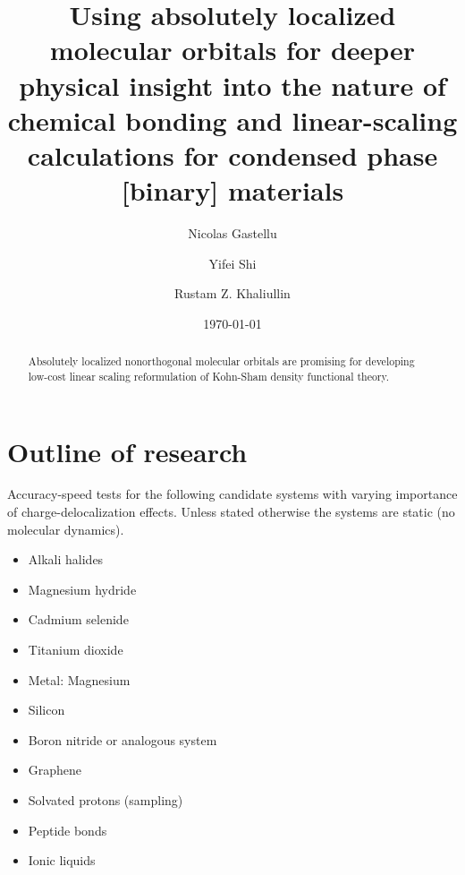 \documentclass[aps,prb,twocolumn,amsmath,amssymb,superscriptaddress,longbibliography]{revtex4-1}
\begin{document}
\title{
Using absolutely localized molecular orbitals for deeper physical insight into the nature of chemical bonding and linear-scaling calculations for condensed phase [binary] materials 
}

\author{Nicolas Gastellu}
\author{Yifei Shi}
\author{Rustam Z. Khaliullin}

\date{\today}

\begin{abstract}
Absolutely localized nonorthogonal molecular orbitals are promising for developing low-cost linear scaling reformulation of Kohn-Sham density functional theory.
\end{abstract}

\maketitle
 
\section{Outline of research}

Accuracy-speed tests for the following candidate systems with varying importance of charge-delocalization effects. 
Unless stated otherwise the systems are static (no molecular dynamics).

\begin{itemize}
\item Alkali halides
\item Magnesium hydride
\item Cadmium selenide
\item Titanium dioxide
\item Metal: Magnesium
\item Silicon
\item Boron nitride or analogous system
\item Graphene
\item Solvated protons (sampling)
\item Peptide bonds
\item Ionic liquids
\end{itemize}
\end{document}
